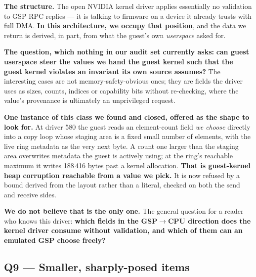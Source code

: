 \documentclass[10.5pt]{article}
\begin{document}
\textbf{The structure.} The open NVIDIA kernel driver applies essentially no validation to GSP RPC
replies — it is talking to firmware on a device it already trusts with full DMA. \textbf{In this
architecture, we occupy that position}, and the data we return is derived, in part, from what the
guest's own \emph{userspace} asked for.

\textbf{The question, which nothing in our audit set currently asks:} \textbf{can guest userspace
steer the values we hand the guest kernel such that the guest kernel violates an invariant its own
source assumes?} The interesting cases are not memory-safety-obvious ones; they are fields the
driver uses as sizes, counts, indices or capability bits without re-checking, where the value's
provenance is ultimately an unprivileged request.

\textbf{One instance of this class we found and closed, offered as the shape to look for.} At
driver 580 the guest reads an element-count field \emph{we choose} directly into a copy loop whose
staging area is a fixed small number of elements, with the live ring metadata as the very next
byte. A count one larger than the staging area overwrites metadata the guest is actively using; at
the ring's reachable maximum it writes 188\,416 bytes past a kernel allocation. \textbf{That is
guest-kernel heap corruption reachable from a value we pick.} It is now refused by a bound derived
from the layout rather than a literal, checked on both the send and receive sides.

\textbf{We do not believe that is the only one.} The general question for a reader who knows this
driver: \textbf{which fields in the GSP$\to$CPU direction does the kernel driver consume without
validation, and which of them can an emulated GSP choose freely?}

\subsection*{Q9 --- Smaller, sharply-posed items}
\end{document}

